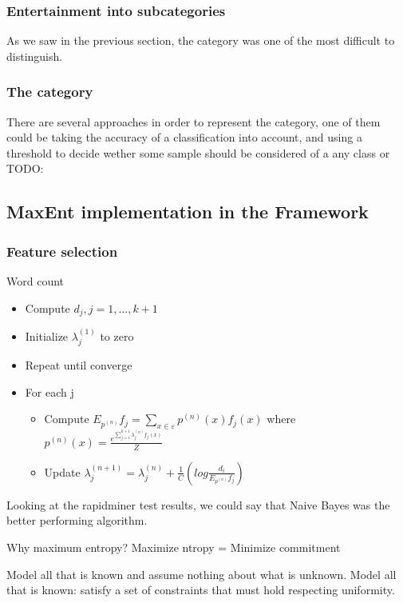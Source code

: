 \subsubsection{Entertainment into subcategories}
As we saw in the previous section, the category  was one of the most difficult to distinguish. 

\subsubsection{The  category}
There are several approaches in order to represent the  category, one of them could be taking the accuracy of a classification into account, and using a threshold to decide wether
some sample should be considered of a any class or TODO:  


\subsection{MaxEnt implementation in the Framework}


\subsubsection{Feature selection}
Word count

\begin{itemize}
\item Compute $d_j, j=1,...,k+1$
\item Initialize $\lambda_j^{(1)}$ to zero
\item Repeat until converge
\item For each j 
  \begin{itemize}
  \item Compute $E_{p^{(n)}} f_j = \sum\limits_{x \in \varepsilon} p^{(n)} (x)f_j(x)$
    where $p^{(n)}(x) = \frac{e^{\sum\limits_{j=1}^{k+1}\lambda_j^{(n)}f_j(x)}}{Z}$ 
  \item Update $\lambda_j^{(n+1)} = \lambda_j^{(n)} + \frac{1}{C}(log\frac{d_i}{E_{{p^{(n)}}}f_j})$
  \end{itemize}
\end{itemize}

  
Looking at the rapidminer test results, we could say that Naive Bayes was the better performing algorithm. 

Why maximum entropy?
Maximize ntropy = Minimize commitment

Model all that is known and assume nothing about what is unknown. 
Model all that is known: satisfy a set of constraints that must hold respecting uniformity.

